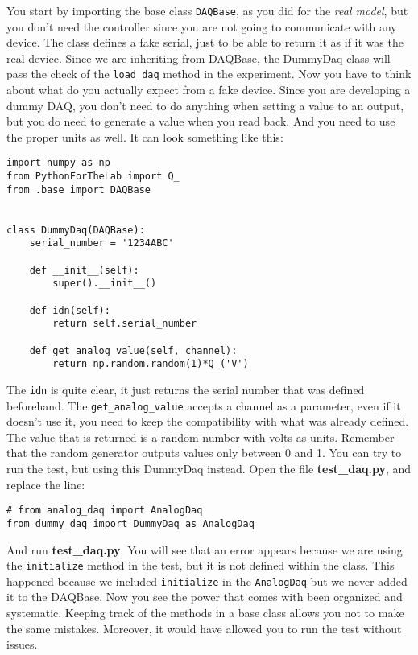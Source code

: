 You start by importing the base class \texttt{DAQBase}, as you did for the \emph{real model}, but you don't need the controller since you are not going to communicate with any device. The class defines a fake serial, just to be able to return it as if it was the real device. Since we are inheriting from DAQBase, the DummyDaq class will pass the check of the \texttt{load_daq} method in the experiment. Now you have to think about what do you actually expect from a fake device. Since you are developing a dummy {DAQ}, you don't need to do anything when setting a value to an output, but you do need to generate a value when you read back. And you need to use the proper units as well. It can look something like this:

\begin{verbatim}
import numpy as np
from PythonForTheLab import Q_
from .base import DAQBase


class DummyDaq(DAQBase):
    serial_number = '1234ABC'
    
    def __init__(self):
        super().__init__()
    
    def idn(self):
        return self.serial_number
    
    def get_analog_value(self, channel):
        return np.random.random(1)*Q_('V')

\end{verbatim}

The \texttt{idn} is quite clear, it just returns the serial number that was defined beforehand. The \texttt{get_analog_value} accepts a channel as a parameter, even if it doesn't use it, you need to keep the compatibility with what was already defined. The value that is returned is a random number with volts as units. Remember that the random generator outputs values only between 0 and 1. You can try to run the test, but using this DummyDaq instead. Open the file \textbf{test\_daq.py}, and replace the line:

\begin{verbatim}
# from analog_daq import AnalogDaq
from dummy_daq import DummyDaq as AnalogDaq
\end{verbatim}

And run \textbf{test\_daq.py}. You will see that an error appears because we are using the \texttt{initialize} method in the test, but it is not defined within the class. This happened because we included \texttt{initialize} in the \texttt{AnalogDaq} but we never added it to the DAQBase. Now you see the power that comes with been organized and systematic. Keeping track of the methods in a base class allows you not to make the same mistakes. Moreover, it would have allowed you to run the test without issues.

